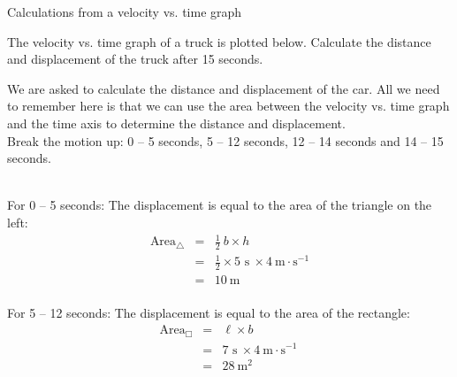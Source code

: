     \noindent 
\begin{wex}{Calculations from a velocity vs. time graph}
{The velocity vs. time graph of a truck is plotted below. Calculate the distance and displacement of the truck after 15 seconds.
\begin{center}
\end{center}}
{
We are asked to calculate the distance and displacement of the car. All we need to remember here is that we can use the area between the velocity vs. time graph and the time axis to determine the distance and displacement.\\
Break the motion up: 0 -- 5 seconds, 5 -- 12 seconds, 12 -- 14 seconds and 14 -- 15 seconds.\\
\\
\begin{minipage}{0.4\textwidth}
For 0 -- 5 seconds: The displacement is equal to the area of the triangle on the left:
\begin{eqnarray*}
\text{Area}_{\triangle} &=& \frac{1}{2}~b \times h\\
&=& \frac{1}{2} \times 5\text{~s}\ \times 4 ~\text{m}\cdot \text{s}^{-1}  \\
&=&10\ \text{m}\\
\end{eqnarray*}
\end{minipage}
\begin{minipage}{0.05\textwidth}
\begin{center}
\end{center}
\end{minipage}
\begin{minipage}{0.4\textwidth}
For 5 -- 12 seconds: The displacement is equal to the area of the rectangle:\\
\begin{eqnarray*}
\text{Area}_{\Box} &=& \ell \times b\\
&=&7\text{~s}\ \times 4 ~\text{m}\cdot \text{s}^{-1}\ \\
&=&28\ \text{m}^2\\
\end{eqnarray*}
\end{minipage}

}
\end{wex}
